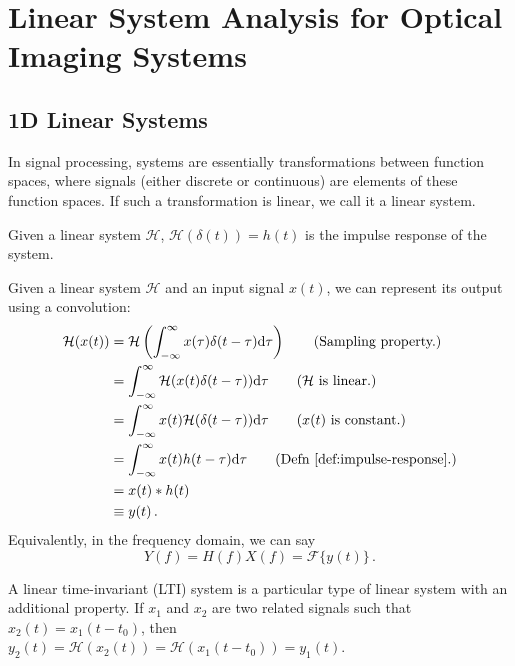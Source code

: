 \chapter{Linear System Analysis for Optical Imaging Systems}
\label{chpt:linsys}

\section{1D Linear Systems}

In signal processing, systems are essentially transformations between function spaces, where signals (either discrete or continuous) are elements of these function spaces.
If such a transformation is linear, we call it a linear system.

\begin{defn}
\label{def:impulse-response}
Given a linear system $\mathcal H$, $\mathcal H(\delta(t)) = h(t)$ is the impulse response of the system.
\end{defn}

\begin{defn}[Convolution]
Given a linear system $\mathcal H$ and an input signal $x(t)$, we can represent its output using a convolution:
\begin{align*}
    \mathcal H(x(t))
    &= \mathcal H \left(\int_{-\infty}^\infty x(\tau) \delta(t - \tau) \d\tau \right) \tag{Sampling property.} \\
    &= \int_{-\infty}^\infty \mathcal H(x(t) \delta(t-\tau)) \d\tau \tag{$\mathcal H$ is linear.} \\
    &=\int_{-\infty}^\infty x(t) \mathcal H(\delta(t-\tau)) \d\tau \tag{$x(t)$ is constant.} \\ 
    &=\int_{-\infty}^\infty x(t) h(t-\tau) \d\tau \tag{Defn \ref{def:impulse-response}.} \\ 
    &= x(t) * h(t) \\
    &\equiv y(t) \,.
\end{align*}
Equivalently, in the frequency domain, we can say 
\begin{equation}
    Y(f) = H(f) X(f) = \mathcal F\{y(t)\} \,.
\end{equation}
\end{defn}

\begin{defn}
A linear time-invariant (LTI) system is a particular type of linear system with an additional property.
If $x_1$ and $x_2$ are two related signals such that $x_2(t) = x_1(t-t_0)$, then $y_2(t) = \mathcal H(x_2(t)) = \mathcal H(x_1(t-t_0)) = y_1(t)$.
\end{defn}

